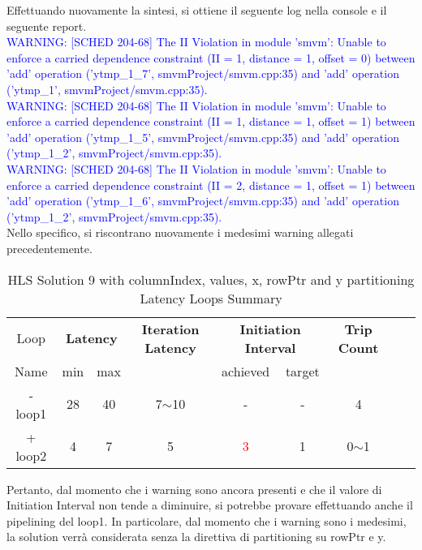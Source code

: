 

Effettuando nuovamente la sintesi, si ottiene il seguente log nella console e il seguente report.
\\
\textcolor{blue}{WARNING: [SCHED 204-68] The II Violation in module 'smvm': Unable to enforce a carried dependence constraint (II = 1, distance = 1, offset = 0)
	between 'add' operation ('ytmp\_1\_7', smvmProject/smvm.cpp:35) and 'add' operation ('ytmp\_1', smvmProject/smvm.cpp:35).}
\\
\textcolor{blue}{WARNING: [SCHED 204-68] The II Violation in module 'smvm': Unable to enforce a carried dependence constraint (II = 1, distance = 1, offset = 1)
	between 'add' operation ('ytmp\_1\_5', smvmProject/smvm.cpp:35) and 'add' operation ('ytmp\_1\_2', smvmProject/smvm.cpp:35).}
\\
\textcolor{blue}{WARNING: [SCHED 204-68] The II Violation in module 'smvm': Unable to enforce a carried dependence constraint (II = 2, distance = 1, offset = 1)
	between 'add' operation ('ytmp\_1\_6', smvmProject/smvm.cpp:35) and 'add' operation ('ytmp\_1\_2', smvmProject/smvm.cpp:35).}
\\
Nello specifico, si riscontrano nuovamente i medesimi warning allegati precedentemente.

\begin{table}[H]
	\centering
	\begin{tabular}{|c|c|c|c|c|c|c|c|c|}
		\hline
		\multicolumn{1}{|c|}{Loop} & \multicolumn{2}{|c|}{\textbf{Latency}} & \multicolumn{1}{c|}{\textbf{Iteration Latency}} & \multicolumn{2}{c|}{\textbf{Initiation Interval}} & \multicolumn{1}{c|}{\textbf{Trip Count}}  \\
		Name & min & max &  & achieved & target &  \\
		\hline
		- loop1 & 28 & 40 & 7$\sim$10 & - & - & 4 \\
		+ loop2 & 4 & 7 & 5 & \textcolor{red}{3} & 1 & 0$\sim$1 \\
		\hline
	\end{tabular}
	\caption{HLS Solution 9 with columnIndex, values, x, rowPtr and y partitioning Latency Loops Summary}
	\label{tab:hls-solution-9-columnindex-values-partitioning-loop-summary}
\end{table}

Pertanto, dal momento che i warning sono ancora presenti e che il valore di Initiation Interval non tende a diminuire, si potrebbe provare effettuando anche il pipelining del loop1. In particolare, dal momento che i warning sono i medesimi, la solution verrà considerata senza la direttiva di partitioning su rowPtr e y.


